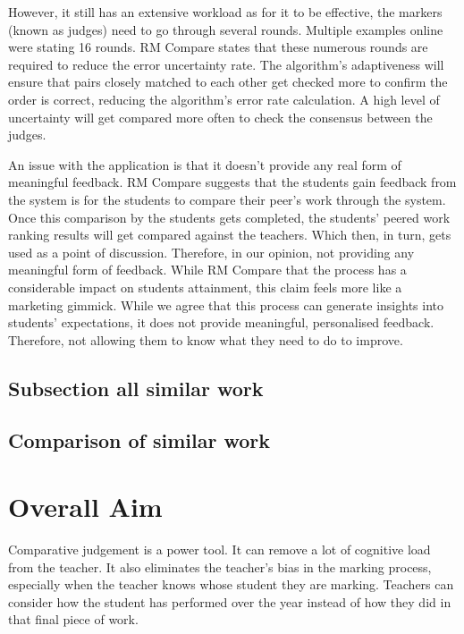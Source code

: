 		However, it still has an extensive workload as for it to be effective, the markers (known as judges) need to go through several rounds. Multiple examples online were stating 16 rounds. RM Compare states that these numerous rounds are required to reduce the error uncertainty rate.  The algorithm's adaptiveness will ensure that pairs closely matched to each other get checked more to confirm the order is correct, reducing the algorithm's error rate calculation. A high level of uncertainty will get compared more often to check the consensus between the judges. 
	
		An issue with the application is that it doesn't provide any real form of meaningful feedback. RM Compare suggests that the students gain feedback from the system is for the students to compare their peer's work through the system. Once this comparison by the students gets completed, the students' peered work ranking results will get compared against the teachers. Which then, in turn, gets used as a point of discussion. Therefore, in our opinion, not providing any meaningful form of feedback. While RM Compare that the process has a considerable impact on students attainment, this claim feels more like a marketing gimmick. While we agree that this process can generate insights into students' expectations, it does not provide meaningful, personalised feedback. Therefore, not allowing them to know what they need to do to improve.



	\subsection{Subsection all similar work}
		\label{sec:resources_bibtex}
	


	\subsection{Comparison of similar work}
	
	\section{Overall Aim}
	Comparative judgement is a power tool. It can remove a lot of cognitive load from the teacher. It also eliminates the teacher's bias in the marking process, especially when the teacher knows whose student they are marking. Teachers can consider how the student has performed over the year instead of how they did in that final piece of work.
	

